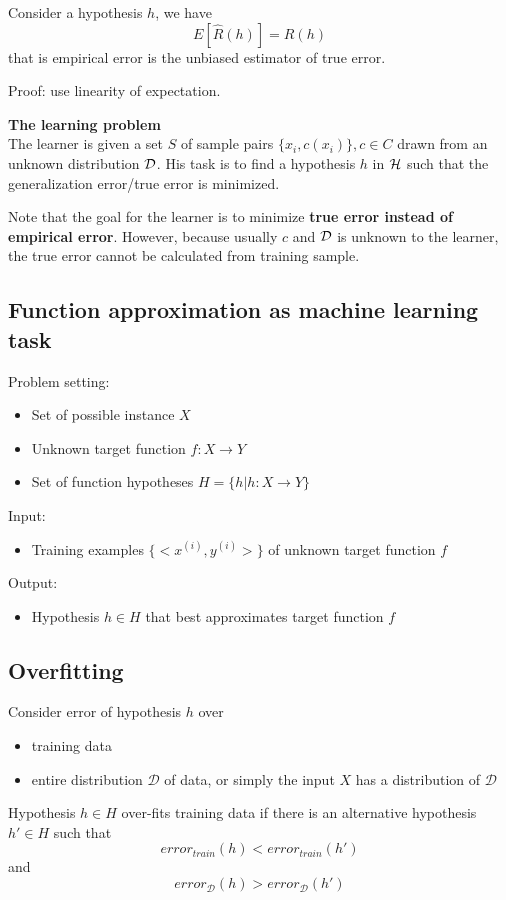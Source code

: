 \begin{refsection}
\begin{lemma}
Consider a hypothesis $h$, we have
$$E[\hat{R}(h)] = R(h)$$
that is empirical error is the unbiased estimator of true error.
\end{lemma}
Proof: use linearity of expectation.


\begin{mdframed}
\textbf{\large The learning problem}\cite[12]{mohri2012foundations}\\

The learner is given a set $S$ of sample pairs $\{x_i,c(x_i)\}, c\in C$ drawn from an unknown distribution $\mathcal{D}$. His task is to find a hypothesis $h$ in $\mathcal{H}$ such that the generalization error/true error is minimized.
\end{mdframed}

\begin{remark}
Note that the goal for the learner is to minimize \textbf{true error instead of empirical error}. However, because usually $c$ and $\mathcal{D}$ is unknown to the learner, the true error cannot be calculated from training sample. 
\end{remark}


\subsection{Function approximation as machine learning task}
Problem setting:
\begin{itemize}
	\item Set of possible instance $X$
	\item Unknown target function $f:X\rightarrow Y$
	\item Set of function hypotheses $H=\{h|h:X\rightarrow Y\}$
\end{itemize}

Input:
\begin{itemize}
	\item Training examples $\{<x^{(i)},y^{(i)}>\}$ of unknown target function $f$
\end{itemize}

Output:
\begin{itemize}
	\item Hypothesis $h\in H$ that best approximates target function $f$
\end{itemize}



\subsection{Overfitting}
Consider error of hypothesis $h$ over
\begin{itemize}
    \item training data
    \item entire distribution $\mathcal{D}$ of data, or simply the input $X$ has a distribution of $\mathcal{D}$
\end{itemize}
Hypothesis $h\in H$ over-fits training data if there is an alternative hypothesis $h'\in H$ such that
$$error_{train}(h) < error_{train}(h')$$
and
$$error_{\mathcal{D}}(h) > error_{\mathcal{D}}(h')$$





\end{refsection}
